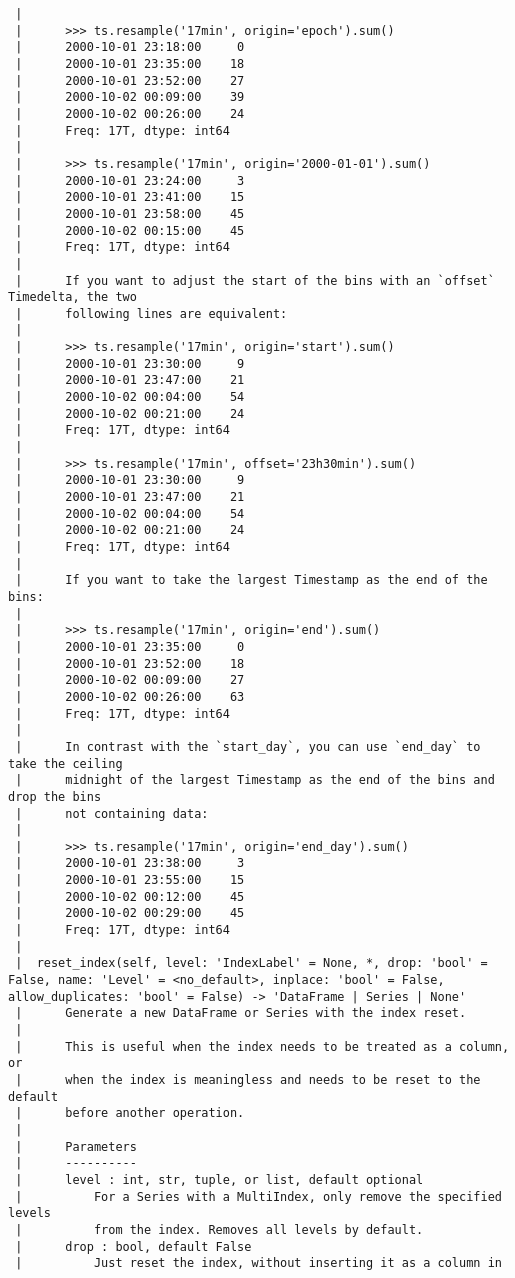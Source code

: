 \documentclass[
  letterpaper,
  DIV=11,
  numbers=noendperiod]{scrreprt}
\begin{document}
\begin{verbatim}
 |      
 |      >>> ts.resample('17min', origin='epoch').sum()
 |      2000-10-01 23:18:00     0
 |      2000-10-01 23:35:00    18
 |      2000-10-01 23:52:00    27
 |      2000-10-02 00:09:00    39
 |      2000-10-02 00:26:00    24
 |      Freq: 17T, dtype: int64
 |      
 |      >>> ts.resample('17min', origin='2000-01-01').sum()
 |      2000-10-01 23:24:00     3
 |      2000-10-01 23:41:00    15
 |      2000-10-01 23:58:00    45
 |      2000-10-02 00:15:00    45
 |      Freq: 17T, dtype: int64
 |      
 |      If you want to adjust the start of the bins with an `offset` Timedelta, the two
 |      following lines are equivalent:
 |      
 |      >>> ts.resample('17min', origin='start').sum()
 |      2000-10-01 23:30:00     9
 |      2000-10-01 23:47:00    21
 |      2000-10-02 00:04:00    54
 |      2000-10-02 00:21:00    24
 |      Freq: 17T, dtype: int64
 |      
 |      >>> ts.resample('17min', offset='23h30min').sum()
 |      2000-10-01 23:30:00     9
 |      2000-10-01 23:47:00    21
 |      2000-10-02 00:04:00    54
 |      2000-10-02 00:21:00    24
 |      Freq: 17T, dtype: int64
 |      
 |      If you want to take the largest Timestamp as the end of the bins:
 |      
 |      >>> ts.resample('17min', origin='end').sum()
 |      2000-10-01 23:35:00     0
 |      2000-10-01 23:52:00    18
 |      2000-10-02 00:09:00    27
 |      2000-10-02 00:26:00    63
 |      Freq: 17T, dtype: int64
 |      
 |      In contrast with the `start_day`, you can use `end_day` to take the ceiling
 |      midnight of the largest Timestamp as the end of the bins and drop the bins
 |      not containing data:
 |      
 |      >>> ts.resample('17min', origin='end_day').sum()
 |      2000-10-01 23:38:00     3
 |      2000-10-01 23:55:00    15
 |      2000-10-02 00:12:00    45
 |      2000-10-02 00:29:00    45
 |      Freq: 17T, dtype: int64
 |  
 |  reset_index(self, level: 'IndexLabel' = None, *, drop: 'bool' = False, name: 'Level' = <no_default>, inplace: 'bool' = False, allow_duplicates: 'bool' = False) -> 'DataFrame | Series | None'
 |      Generate a new DataFrame or Series with the index reset.
 |      
 |      This is useful when the index needs to be treated as a column, or
 |      when the index is meaningless and needs to be reset to the default
 |      before another operation.
 |      
 |      Parameters
 |      ----------
 |      level : int, str, tuple, or list, default optional
 |          For a Series with a MultiIndex, only remove the specified levels
 |          from the index. Removes all levels by default.
 |      drop : bool, default False
 |          Just reset the index, without inserting it as a column in

\end{verbatim}
\end{document}

